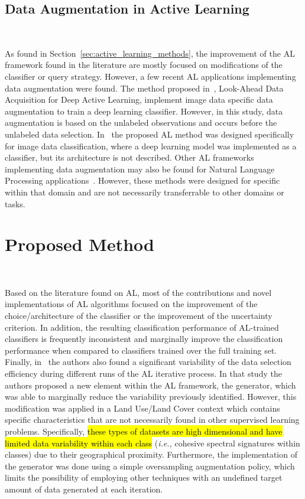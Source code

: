 \documentclass[preprint, 12pt]{elsarticle}
\begin{document}
\subsection{Data Augmentation in Active Learning
}~\label{sec:data_augmentation_in_al}

As found in Section~\ref{sec:active_learning_methods}, the improvement of the
AL framework found in the literature are mostly focused on modifications of
the classifier or query strategy. However, a few recent AL applications
implementing data augmentation were found. The method proposed
in~\cite{Kim2021}, Look-Ahead Data Acquisition for Deep Active Learning,
implement image data specific data augmentation to train a deep learning
classifier. However, in this study, data augmentation is based on the
unlabeled observations and occurs before the unlabeled data selection.
In~\cite{Ma2020} the proposed AL method was designed specifically for image
data classification, where a deep learning model was implemented as a
classifier, but its architecture is not described. Other AL frameworks
implementing data augmentation may also be found for Natural Language
Processing applications~\cite{Quteineh2020, Li2021framework}. However, these
methods were designed for specific within that domain and are not necessarily
transferrable to other domains or tasks.
 
\section{Proposed Method}~\label{sec:proposed_method}

Based on the literature found on AL, most of the contributions and novel
implementations of AL algorithms focused on the improvement of the
choice/architecture of the classifier or the improvement of the uncertainty
criterion. In addition, the resulting classification performance of AL-trained
classifiers is frequently inconsistent and marginally improve the
classification performance when compared to classifiers trained over the full
training set. Finally, in~\cite{Fonseca2021} the authors also found a
significant variability of the data selection efficiency during different runs
of the AL iterative process. In that study the authors proposed a new element
within the AL framework, the generator, which was able to marginally reduce
the variability previously identified. However, this modification was applied
in a Land Use/Land Cover context which contains specific characteristics that
are not necessarily found in other supervised learning problems. Specifically,
\hl{these types of datasets are high dimensional and have limited data
variability within each class} (\textit{i.e.,} cohesive spectral signatures
within classes) due to their geographical proximity. Furthermore, the
implementation of the generator was done using a simple oversampling
augmentation policy, which limits the possibility of employing other
techniques with an undefined target amount of data generated at each
iteration.
 
\end{document}
